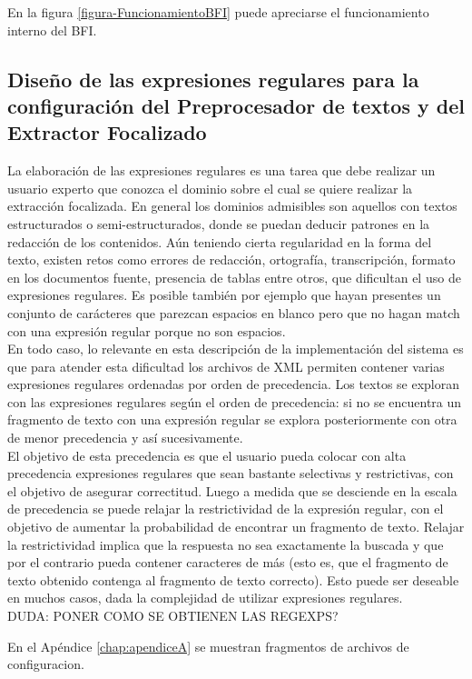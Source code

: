 En la figura \ref{figura-FuncionamientoBFI} puede apreciarse el funcionamiento interno del BFI. \\

\subsection{Diseño de las expresiones regulares para la configuración del Preprocesador de textos y del Extractor Focalizado}\label{sect:implementacion-regexp}

La elaboración de las expresiones regulares es una tarea que debe realizar un usuario experto que conozca el dominio sobre el cual se quiere realizar la extracción focalizada. En general los dominios admisibles son aquellos con textos estructurados o semi-estructurados, donde se puedan deducir patrones en la redacción de los contenidos. Aún teniendo cierta regularidad en la forma del texto, existen retos como errores de redacción, ortografía, transcripción, formato en los documentos fuente, presencia de tablas entre otros, que dificultan el uso de expresiones regulares. Es posible también por ejemplo que hayan presentes un conjunto de carácteres que parezcan espacios en blanco pero que no hagan match con una expresión regular porque no son espacios. \\

En todo caso, lo relevante en esta descripción de la implementación del sistema es que para atender esta dificultad los archivos de XML permiten contener varias expresiones regulares ordenadas por orden de precedencia. Los textos se exploran con las expresiones regulares según el orden de precedencia: si no se encuentra un fragmento de texto con una expresión regular se explora posteriormente con otra de menor precedencia y así sucesivamente. \\

El objetivo de esta precedencia es que el usuario pueda colocar con alta precedencia expresiones regulares que sean bastante selectivas y restrictivas, con el objetivo de asegurar correctitud. Luego a medida que se desciende en la escala de precedencia se puede relajar la restrictividad de la expresión regular, con el objetivo de aumentar la probabilidad de encontrar un fragmento de texto. Relajar la restrictividad implica que la respuesta no sea exactamente la buscada y que por el contrario pueda contener caracteres de más (esto es, que el fragmento de texto obtenido contenga al fragmento de texto correcto). Esto puede ser deseable en muchos casos, dada la complejidad de utilizar expresiones regulares.  \\

DUDA: PONER COMO SE OBTIENEN LAS REGEXPS?

En el Apéndice \ref{chap:apendiceA} se muestran fragmentos de archivos de configuracion. \\
